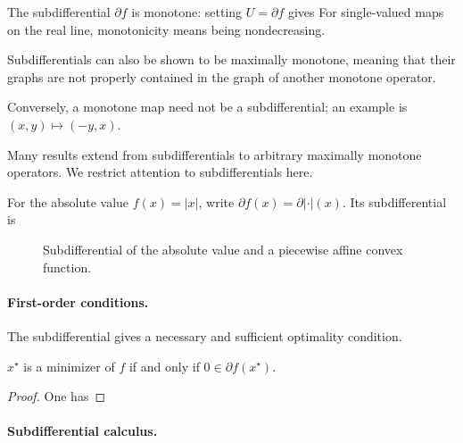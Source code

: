 \begin{rem}
The subdifferential $\partial f$ is monotone: setting $U=\partial f$ gives
For single-valued maps on the real line, monotonicity means being nondecreasing.
 
Subdifferentials can also be shown to be maximally monotone, meaning that their graphs are not properly contained in the graph of another monotone operator.
 
Conversely, a monotone map need not be a subdifferential; an example is $(x,y) \mapsto (-y,x)$.
  
Many results extend from subdifferentials to arbitrary maximally monotone operators. We restrict attention to subdifferentials here.
\end{rem}

For the absolute value $f(x)=|x|$, write $\partial f(x) = \partial |\cdot|(x)$. Its subdifferential is

\begin{figure}[tbp]
\centering
{}
\caption{Subdifferential of the absolute value and a piecewise affine convex function.}
\label{fig-subdiff-l1}
\end{figure}







   
\paragraph{First-order conditions.}

The subdifferential gives a necessary and sufficient optimality condition.

\begin{prop}
	$x^\star$ is a minimizer of $f$ if and only if $0 \in \partial f(x^\star)$.
\end{prop}
\begin{proof}
	One has
\end{proof}

   
\paragraph{Subdifferential calculus.}

